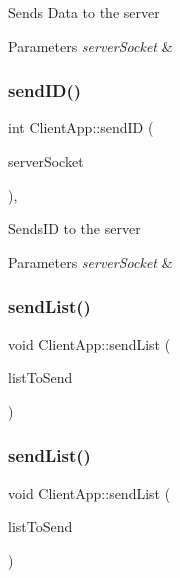 Sends Data to the server 
\begin{DoxyParams}{Parameters}
{\em server\+Socket} & \\
\hline
\end{DoxyParams}
\mbox{\label{class_client_app_a4a769a030e9f6a1dd3dbab2faa679d82}} 
\subsubsection{\texorpdfstring{send\+I\+D()}{sendID()}}
{\footnotesize\ttfamily int Client\+App\+::send\+ID (\begin{DoxyParamCaption}\item[{int}]{server\+Socket }\end{DoxyParamCaption})\hspace{0.3cm}{\ttfamily [protected]}, {\ttfamily [virtual]}}

Sends\+ID to the server 
\begin{DoxyParams}{Parameters}
{\em server\+Socket} & \\
\hline
\end{DoxyParams}
\mbox{\label{class_client_app_adb0b60d56f0399f8c55252a4fcfa2ab0}} 
\subsubsection{\texorpdfstring{send\+List()}{sendList()}\hspace{0.1cm}{\footnotesize\ttfamily [1/3]}}
{\footnotesize\ttfamily void Client\+App\+::send\+List (\begin{DoxyParamCaption}\item[{\hyperlink{class_linked_list}{Linked\+List}$<$ string $>$}]{list\+To\+Send }\end{DoxyParamCaption})}

\mbox{\label{class_client_app_aebf360dfa1e4e75fafe408be459c51b0}} 
\subsubsection{\texorpdfstring{send\+List()}{sendList()}\hspace{0.1cm}{\footnotesize\ttfamily [2/3]}}
{\footnotesize\ttfamily void Client\+App\+::send\+List (\begin{DoxyParamCaption}\item[{\hyperlink{class_linked_list}{Linked\+List}$<$ bool $>$}]{list\+To\+Send }\end{DoxyParamCaption})}

